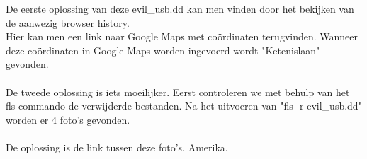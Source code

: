 De eerste oplossing van deze evil\_usb.dd kan men vinden door het bekijken van de aanwezig browser history.\\
Hier kan men een link naar Google Maps met co\"ordinaten terugvinden. Wanneer deze co\"ordinaten in Google Maps worden ingevoerd wordt "Ketenislaan" gevonden.\\\\
De tweede oplossing is iets moeilijker. Eerst controleren we met behulp van het fls-commando de verwijderde bestanden. Na het uitvoeren van "fls -r evil\_usb.dd" worden er 4 foto's gevonden.\\\\
De oplossing is de link tussen deze foto's. Amerika.